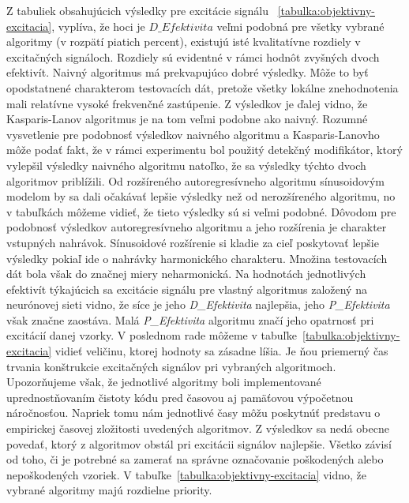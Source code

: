 Z tabuliek obsahujúcich výsledky pre excitácie signálu ~\ref{tabulka:objektivny-excitacia}, vyplíva, že hoci je $D\_Efektivita$ veľmi podobná pre všetky vybrané algoritmy (v rozpätí piatich percent), existujú isté kvalitatívne rozdiely v excitačných signáloch. Rozdiely sú evidentné v rámci hodnôt zvyšných dvoch efektivít. Naivný algoritmus má prekvapujúco dobré výsledky. Môže to byť opodstatnené charakterom testovacích dát, pretože všetky lokálne znehodnotenia mali relatívne vysoké frekvenčné zastúpenie. Z výsledkov je ďalej vidno, že Kasparis-Lanov algoritmus je na tom veľmi podobne ako naivný. Rozumné vysvetlenie pre podobnosť výsledkov naivného algoritmu a Kasparis-Lanovho môže podať fakt, že v rámci experimentu bol použitý detekčný modifikátor, ktorý vylepšil výsledky naivného algoritmu natoľko, že sa výsledky týchto dvoch algoritmov priblížili. Od rozšíreného autoregresívneho algoritmu sínusoidovým modelom by sa dali očakávať lepšie výsledky než od nerozšíreného algoritmu, no v tabuľkách môžeme vidieť, že tieto výsledky sú si veľmi podobné. Dôvodom pre podobnosť výsledkov autoregresívneho algoritmu a jeho rozšírenia je charakter vstupných nahrávok. Sínusoidové rozšírenie si kladie za cieľ poskytovať lepšie výsledky pokiaľ ide o nahrávky harmonického charakteru. Množina testovacích dát bola však do značnej miery neharmonická. Na hodnotách jednotlivých efektivít týkajúcich sa excitácie signálu pre vlastný algoritmus založený na neurónovej sieti vidno, že síce je jeho \textit{D\_Efektivita} najlepšia, jeho \textit{P\_Efektivita} však značne zaostáva. Malá \textit{P\_Efektivita} algoritmu značí jeho opatrnosť pri excitácií danej vzorky. V poslednom rade môžeme v tabuľke~\ref{tabulka:objektivny-excitacia} vidieť veličinu, ktorej hodnoty sa zásadne líšia. Je ňou priemerný čas trvania konštrukcie excitačných signálov pri vybraných algoritmoch. Upozorňujeme však, že jednotlivé algoritmy boli implementované uprednostňovaním čistoty kódu pred časovou aj pamäťovou výpočetnou náročnosťou. Napriek tomu nám jednotlivé časy môžu poskytnúť predstavu o empirickej časovej zložitosti uvedených algoritmov. Z výsledkov sa nedá obecne povedať, ktorý z algoritmov obstál pri excitácii signálov najlepšie. Všetko závisí od toho, či je potrebné sa zamerať na správne označovanie poškodených alebo nepoškodených vzoriek. V tabuľke~\ref{tabulka:objektivny-excitacia} vidno, že vybrané algoritmy majú rozdielne priority.

